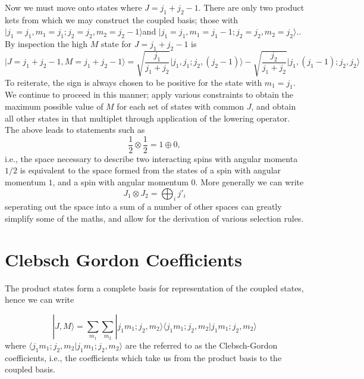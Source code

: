 \documentclass[12pt]{article}
\begin{document}
\noindent Now we must move onto states where $J= j_{1}+j_{2}-1$. There are only
two product kets from which we may construct the coupled basis; those with $|
j_{1}=j_{1}, m_{1}=j_{1}; j_{2}=j_{2}, m_{2} = j_{2}-1\rangle $and  
$| j_{1}=j_{1}, m_{1}=j_{1}-1; j_{2}=j_{2}, m_{2} = j_{2}\rangle. $. By
inspection the high $M$ state for $J=j_{1}+j_{2}-1$ is
\begin{equation}
|J= j_{1}+j_{2}-1, M=j_{1}+j_{2}-1\rangle =
 \sqrt{\frac{j_{1}}{j_{1}+j_{2}}} \Bigg|j_{1}, j_{1}; j_{2}, (j_{2}-1) \Bigg\rangle
-\sqrt{\frac{j_{2}}{j_{1}+j_{2}}} \Bigg|j_{1}, (j_{1}-1); j_{2}, j_{2} \Bigg\rangle
\end{equation}
\noindent To reiterate, the sign is always chosen to be positive for the state
with $m_{1}=j_{1}$.\\

\noindent We continue to proceed in this manner; apply various constraints to
obtain the maximum possible value of $M$ for each set of states with common
$J$, and obtain all other states in that multiplet through application of the
lowering operator.\\

\noindent The above leads to statements such as 
\begin{equation}
\frac{1}{2}\otimes\frac{1}{2}=1\oplus 0,
\end{equation}
i.e., the space necessary to describe two interacting spins with angular
momenta $1/2$ is equivalent to the space formed from the states of a spin with
angular momentum $1$, and a spin with angular momentum $0$. More generally we
can write
\begin{equation}
J_{1}\otimes J_{2} = \bigoplus_{i} j'_{i}
\end{equation}
seperating out the space into a sum of a number of other spaces can greatly
simplify some of the maths, and allow for the derivation of various selection
rules.

\section{Clebsch Gordon Coefficients}
The product states form a complete basis for representation of the coupled
states, hence we can write

\begin{equation}
|J, M \rangle=  \sum_{m_{1}}\sum_{m_{2}}
|j_{1}m_{1};j_{2},m_{2}\rangle\langle j_{1}m_{1};j_{2},m_{2}|
j_{1}m_{1};j_{2},m_{2}\rangle 
\end{equation}
\noindent where $\langle
j_{1}m_{1};j_{2},m_{2}|j_{1}m_{1};j_{2},m_{2}\rangle $ are the referred to as
the Clebsch-Gordon coefficients, i.e., the coefficients which take us from the
product basis to the coupled basis.\\
 
\end{document}

